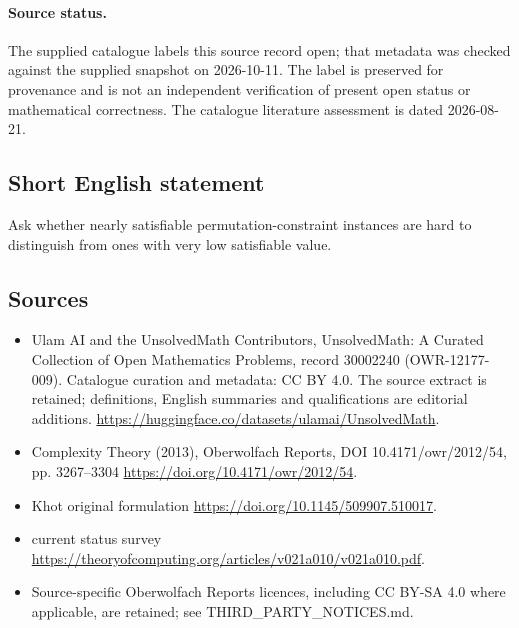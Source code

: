 \documentclass[11pt]{article}
\begin{document}
\paragraph{Source status.}
The supplied catalogue labels this source record open; that metadata was checked against the supplied snapshot on 2026-10-11. The label is preserved for provenance and is not an independent verification of present open status or mathematical correctness. The catalogue literature assessment is dated 2026-08-21.
\subsection{Short English statement}
Ask whether nearly satisfiable permutation-constraint instances are hard to distinguish from ones with very low satisfiable value.
\subsection{Sources}
\begin{itemize}
\item[\hypertarget{source:30002240:1}{S1}] Ulam AI and the UnsolvedMath Contributors, UnsolvedMath: A Curated Collection of Open Mathematics Problems, record 30002240 (OWR-12177-009). Catalogue curation and metadata: CC BY 4.0. The source extract is retained; definitions, English summaries and qualifications are editorial additions.
\url{https://huggingface.co/datasets/ulamai/UnsolvedMath}.
\item[\hypertarget{source:30002240:2}{S2}] Complexity Theory (2013), Oberwolfach Reports, DOI 10.4171/owr/2012/54, pp. 3267--3304
\url{https://doi.org/10.4171/owr/2012/54}.
\item[\hypertarget{source:30002240:3}{S3}] Khot original formulation
\url{https://doi.org/10.1145/509907.510017}.
\item[\hypertarget{source:30002240:4}{S4}] current status survey
\url{https://theoryofcomputing.org/articles/v021a010/v021a010.pdf}.
\item Source-specific Oberwolfach Reports licences, including CC BY-SA 4.0 where applicable, are retained; see THIRD\_PARTY\_NOTICES.md.
\end{itemize}
\end{document}
